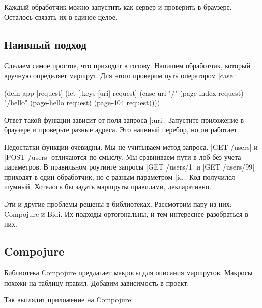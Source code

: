 Каждый обработчик можно запустить как сервер и проверить в браузере. Осталось
связать их в единое целое.

\subsection{Наивный подход}

Сделаем самое простое, что приходит в голову. Напишем обработчик, который
вручную определяет маршрут. Для этого проверим путь оператором \spverb|case|:

\begin{english}
  \begin{clojure}
(defn app [request]
  (let [{:keys [uri]} request]
    (case uri
      "/"      (page-index request)
      "/hello" (page-hello request)
      (page-404 request))))
  \end{clojure}
\end{english}

Ответ такой функции зависит от поля запроса \spverb|:uri|. Запустите приложение
в браузере и проверьте разные адреса. Это наивный перебор, но он работает.

Недостатки функции очевидны. Мы не учитываем метод запроса. \spverb|GET /users|
и \spverb|POST /users| отличаются по смыслу. Мы сравниваем пути в лоб без учета
параметров. В правильном роутинге запросы \spverb|GET /users/1| и \spverb|GET /users/99|
приходят в один обработчик, но с разным параметром \spverb|id|. Код
получился шумный. Хотелось бы задать маршруты правилами, декларативно.

Эти и другие проблемы решены в библиотеках. Рассмотрим пару из них: Compojure и
Bidi. Их подходы ортогональны, и тем интереснее разобраться в них.

\subsection{Compojure}

\label{compojure}

Библиотека Compojure
предлагает макросы для описания маршрутов. Макросы похожи на таблицу правил.
Добавим зависимость в проект:

\begin{english}
  \begin{clojure}
[compojure "1.6.1"]
  \end{clojure}
\end{english}

\noindent
Так выглядит приложение на Compojure:

